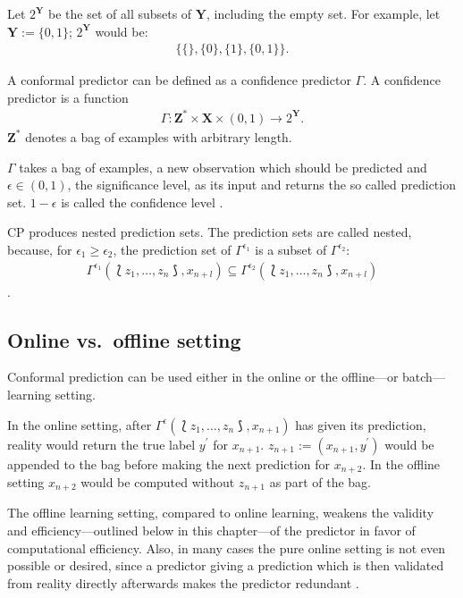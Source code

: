 \documentclass[twoside,11pt]{article}
\begin{document}
Let $2^\textbf{Y}$ be the set of all subsets of
$\textbf{Y}$, including the empty set.
For example, let $\textbf{Y} := \{0,1\}$;
$2^{\textbf{Y}}$ would be:
\begin{align*}
  \{\{\},\{0\},\{1\},\{0,1\}\}.
\end{align*}


A conformal predictor can be defined as a confidence
predictor $\Gamma$. A confidence predictor is a function
\begin{align*}
\Gamma: \textbf{Z}^* \times \textbf{X} \times (0,1)
\rightarrow 2^\textbf{Y}.
\end{align*}
$\textbf{Z}^*$ denotes a bag of examples with arbitrary
length.

$\Gamma$ takes a bag of examples, a new observation which
should be predicted and $\epsilon \in (0,1)$,
the significance level, as its input and returns the so
called prediction set.
$1 - \epsilon$ is called the confidence level
\citep[see][Chapter 2]{alrw}.

CP produces nested prediction sets.
The prediction sets are called nested, because, for
$\epsilon_1 \geq \epsilon_2$, the prediction set of
$\Gamma^{\epsilon_1}$ is a subset of $\Gamma^{\epsilon_2}$:
\begin{align*}
\Gamma^{\epsilon_1}(\Lbag z_1,\dots,z_n \Rbag, x_{n+l})
\subseteq
\Gamma^{\epsilon_2}(\Lbag z_1,\dots,z_n \Rbag, x_{n+l})
\end{align*}
\citep[see][Chapter 2]{alrw}.

\subsection*{Online vs.\ offline setting}
Conformal prediction can
be used either in the online or the offline---or
batch---learning setting.

In the online setting, after
$\Gamma^{\epsilon}(\Lbag z_1,\dots,z_n \Rbag, x_{n+1})$
has given its prediction, reality would return the
true label $y^{\prime}$ for $x_{n+1}$.
$z_{n+1} := (x_{n+1}, y^{\prime})$ would be appended to
the bag before making the next prediction for $x_{n+2}$.
In the offline setting $x_{n+2}$ would be computed without
$z_{n+1}$ as part of the bag.

The offline learning setting, compared to online learning,
weakens the validity and efficiency---outlined below in
this chapter---of the predictor in favor of computational
efficiency. Also, in many cases the pure online setting is
not even possible or desired, since a predictor giving a
prediction which is then validated from reality directly
afterwards makes the predictor redundant
\citep[see][Chapter 4]{alrw}.
\end{document}

